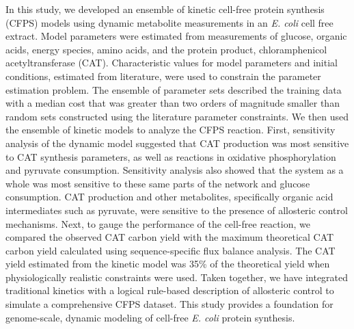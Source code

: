 \documentclass[12pt]{article}
\begin{document}
In this study, we developed an ensemble of kinetic cell-free protein synthesis (CFPS) models using dynamic metabolite measurements in an \textit{E. coli} cell free extract.
Model parameters were estimated from measurements of glucose, organic acids, energy species, amino acids, and the protein product, chloramphenicol acetyltransferase (CAT).
Characteristic values for model parameters and initial conditions, estimated from literature, were used to constrain the parameter estimation problem.
The ensemble of parameter sets described the training data with a median cost that was greater than two orders of magnitude smaller than random sets constructed using the literature parameter constraints. We then used the ensemble of kinetic models to analyze the CFPS reaction.
First, sensitivity analysis of the dynamic model suggested that CAT production was most sensitive to CAT synthesis parameters, as well as reactions in oxidative phosphorylation and pyruvate consumption.
Sensitivity analysis also showed that the system as a whole was most sensitive to these same parts of the network and glucose consumption.
CAT production and other metabolites, specifically organic acid intermediates such as pyruvate, were sensitive to the presence of allosteric control mechanisms.
Next, to gauge the performance of the cell-free reaction, we compared the observed CAT carbon yield with the maximum theoretical CAT carbon yield calculated using sequence-specific flux balance analysis. The CAT yield estimated from the kinetic model was 35\% of the theoretical yield when physiologically realistic constraints were used.
Taken together, we have integrated traditional kinetics with a logical rule-based description of allosteric control to simulate a comprehensive CFPS dataset.
This study provides a foundation for genome-scale, dynamic modeling of cell-free \textit{E. coli} protein synthesis.
\end{document}
